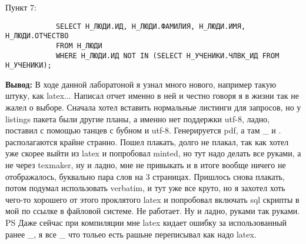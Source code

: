 \documentclass[11pt,a4paper]{article}
\begin{document}
\begin{flushleft}
		Пункт 7:
		\begin{verbatim}
			SELECT Н_ЛЮДИ.ИД, Н_ЛЮДИ.ФАМИЛИЯ, Н_ЛЮДИ.ИМЯ, Н_ЛЮДИ.ОТЧЕСТВО 
			FROM Н_ЛЮДИ 
			WHERE Н_ЛЮДИ.ИД NOT IN (SELECT Н_УЧЕНИКИ.ЧЛВК_ИД FROM Н_УЧЕНИКИ);
		\end{verbatim}
		
		\textbf{{\large Вывод:}}
		В ходе данной лаборатоной я узнал много нового, например такую штуку, как latex... Написал отчет именно в ней и честно говоря я в жизни так не жалел о выборе. Сначала хотел вставить нормальные листинги для запросов, но у listings пакета были другие планы, а именно нет поддержки utf-8, ладно, поставил с помощью танцев с бубном и utf-8. Генерируется pdf, а там \_ и . располагаются крайне странно. Пошел плакать, долго не плакал, так как хотел уже скорее выйти из latex и попробовал minted, но тут надо делать все руками, а не через texmaker, ну и ладно, мне не привыкать и в итоге вообще ничего не отображалось, буквально пара слов на 3 страницах. Пришлось снова плакать, потом подумал использовать verbatim, и тут уже все круто, но я захотел хоть чего-то хорошего от этого проклятого latex и попробовал включать sql скрипты в мой по ссылке в файловой системе. Не работает. Ну и ладно, руками так руками. PS Даже сейчас при компиляции мне latex кидает ошибку за использованный ранее \_, я все \_ что тольео есть рашьне переписывал как надо latex.
	\end{flushleft}
\end{document}
